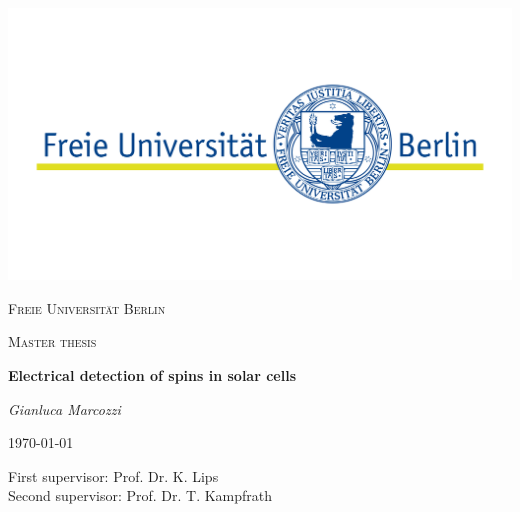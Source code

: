 \documentclass[a4paper]{book}
\begin{document}
	\begin{titlepage}
		\thispagestyle{empty}
		\centering
		\includegraphics[width=\textwidth]{images/fu_logo}\par\vspace{1cm}
		{\scshape\LARGE Freie Universität Berlin \par}
		\vspace{1cm}
		{\scshape\Large Master thesis \par}
		\vspace{1.5cm}
		{\huge\bfseries Electrical detection of spins in solar cells \par}
		\vspace{2cm}
		{\Large\itshape Gianluca Marcozzi \par}
		\vfill
		{\large \today\par}
	\end{titlepage}
	
	\thispagestyle{empty}
	\null\vfill
	\begin{center}
		{\large First supervisor: Prof. Dr. K. Lips\\
			Second supervisor: Prof. Dr. T. Kampfrath \par}
	\end{center}
	\clearpage
	
	\setcounter{page}{1}
	
	\clearpage
	\tableofcontents
	
	
\end{document}
